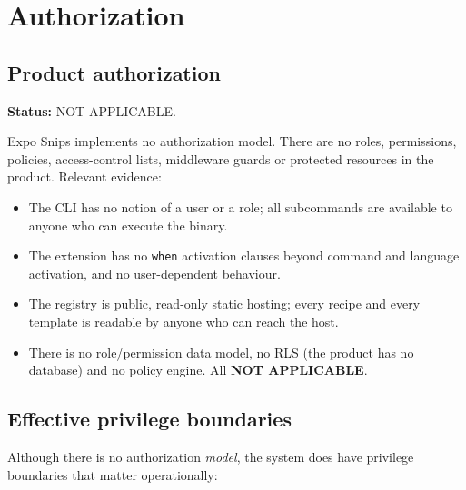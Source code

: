 \chapter{Authorization}
\label{ch:authorization}

\section{Product authorization}

\textbf{Status:} NOT APPLICABLE.

Expo Snips implements no authorization model. There are no roles, permissions,
policies, access-control lists, middleware guards or protected resources in the
product. Relevant evidence:

\begin{itemize}
  \item The CLI has no notion of a user or a role; all subcommands are available to
        anyone who can execute the binary.
  \item The extension has no \texttt{when} activation clauses beyond command and
        language activation, and no user-dependent behaviour.
  \item The registry is public, read-only static hosting; every recipe and every
        template is readable by anyone who can reach the host.
  \item There is no role/permission data model, no RLS (the product has no
        database) and no policy engine. All \textbf{NOT APPLICABLE}.
\end{itemize}

\section{Effective privilege boundaries}

Although there is no authorization \emph{model}, the system does have privilege
boundaries that matter operationally:

